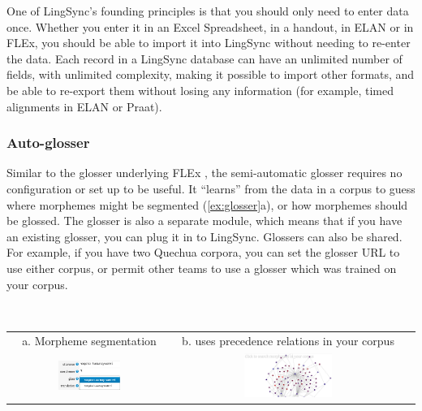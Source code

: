 \documentclass[letterpaper, 12pt, dvips]{mitwpl}
\begin{document}
One of LingSync's founding principles is that you should only need to enter data once.
Whether you enter it in an Excel Spreadsheet,
in a handout,
in ELAN or in FLEx,
you should be able to import it into LingSync without needing to re-enter the data.
 Each record in a LingSync database can have an unlimited number of fields,
with unlimited complexity,
making it possible to import other formats,
and be able to re-export them without losing any information (for example,
timed alignments in ELAN or Praat).



\subsubsection{Auto-glosser}
\label{sec:autoglosser}
 

Similar to the glosser underlying FLEx \citep{Black:2006}, the semi-automatic glosser requires no configuration or set up to be useful.
It ``learns'' from the data in a corpus to guess where morphemes might be segmented (\ref{ex:glosser}a),
or how morphemes should be glossed.
The glosser is also a separate module,
which means that if you have an existing glosser, you can plug it in to LingSync.
Glossers can also be shared.
For example,
if you have two Quechua corpora,
you can set the glosser URL to use either corpus, or permit other teams to use a glosser which was trained on your corpus.
 


\begin{exe} 
\ex \label{ex:glosser}  ~  \\ 
 \begin{tabular}{c c c} 
 a. Morpheme segmentation  & b. uses precedence relations in your corpus\\
  \includegraphics[width=0.4\textwidth]{glosser} &
   \includegraphics[width=0.4\textwidth]{morphemePrecedenceRelations}
\end{tabular}
\end{exe}
\end{document}
